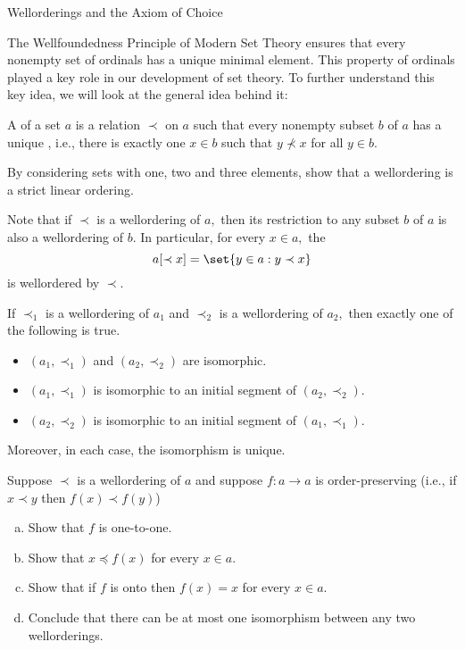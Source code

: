 \begin{unit}{Wellorderings and the Axiom of Choice}

The Wellfoundedness Principle of Modern Set Theory ensures that every nonempty set of ordinals has a unique minimal element.
This property of ordinals played a key role in our development of set theory.
To further understand this key idea, we will look at the general idea behind it:

\begin{definition}\label{D:Wellordering}
  A  of a set \(a\) is a relation \({\prec}\) on \(a\) such that every nonempty subset \(b\) of \(a\) has a unique , i.e., there is exactly one \(x \in b\) such that \(y \nprec x\) for all \(y \in b.\)
\end{definition}

\begin{problem}
  By considering sets with one, two and three elements, show that a wellordering is a strict linear ordering.
\end{problem}

\noindent
Note that if \(\prec\) is a wellordering of \(a,\) then its restriction to any subset \(b\) of \(a\) is also a wellordering of \(b.\)
In particular, for every \(x \in a,\) the  \[a[{\prec x}] = \set{y \in a : y \prec x}\] is wellordered by \(\prec.\)

\begin{theorem}\label{T:ComparabilityOfWellorderings}
  If \(\prec_1\) is a wellordering of \(a_1\) and \(\prec_2\) is a wellordering of \(a_2,\) then exactly one of the following is true.
  \begin{itemize}
  \item \((a_1,{\prec_1})\) and \((a_2,{\prec_2})\) are isomorphic.
  \item \((a_1,{\prec_1})\) is isomorphic to an initial segment of \((a_2,{\prec_2}).\)
  \item \((a_2,{\prec_2})\) is isomorphic to an initial segment of \((a_1,{\prec_1}).\)
  \end{itemize}
  Moreover, in each case, the isomorphism is unique.
\end{theorem}

\begin{problem}
  Suppose \(\prec\) is a wellordering of \(a\) and suppose \(f:a \to a\) is order-preserving (i.e., if \(x \prec y\) then \(f(x) \prec f(y)\))
  \begin{enumerate}[(a)]
  \item Show that \(f\) is one-to-one.
  \item Show that \(x \preceq f(x)\) for every \(x \in a.\)
  \item Show that if \(f\) is onto then \(f(x) = x\) for every \(x \in a.\)
  \item Conclude that there can be at most one isomorphism between any two wellorderings.
  \end{enumerate}
\end{problem}


\end{unit}
